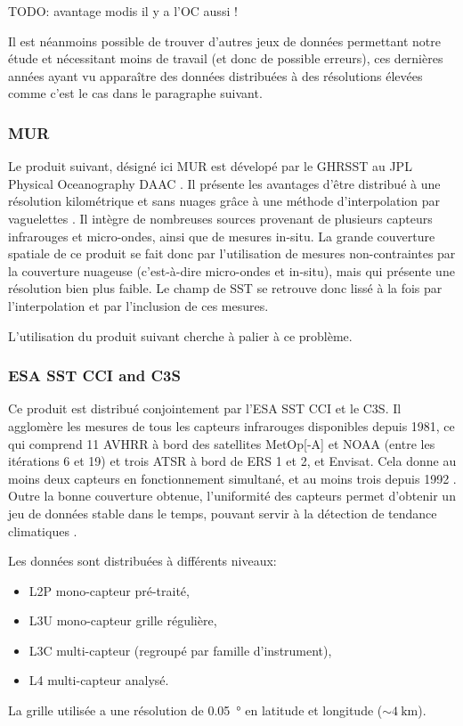 \documentclass[index]{subfiles}
\begin{document}
TODO: avantage modis il y a l'OC aussi !

Il est néanmoins possible de trouver d'autres jeux de données permettant notre étude et nécessitant moins de travail (et donc de possible erreurs), ces dernières années ayant vu apparaître des données distribuées à des résolutions élevées comme c'est le cas dans le paragraphe suivant.

\subsubsection{MUR}
\label{sec:donnees-sst-ghrsst}

Le produit suivant, désigné ici \gls{MUR} est dévelopé par le \gls{GHRSST} au JPL Physical Oceanography DAAC \parencite{sst_mur}.
Il présente les avantages d'être distribué à une résolution kilométrique et sans nuages grâce à une méthode d'interpolation par vaguelettes \parencite{chin_2017}.
Il intègre de nombreuses sources provenant de plusieurs capteurs infrarouges et micro-ondes, ainsi que de mesures in-situ.
La grande couverture spatiale de ce produit se fait donc par l'utilisation de mesures non-contraintes par la couverture nuageuse (c'est-à-dire micro-ondes et in-situ), mais qui présente une résolution bien plus faible.
Le champ de \gls{SST} se retrouve donc lissé à la fois par l'interpolation et par l'inclusion de ces mesures.

L'utilisation du produit suivant cherche à palier à ce problème.

\subsubsection{ESA SST CCI and C3S}
\label{sec:donnees-sst-esacci}

Ce produit est distribué conjointement par l'\gls{ESA} \gls{SST} \gls{CCI} et le \gls{C3S}.
Il agglomère les mesures de tous les capteurs infrarouges disponibles depuis 1981, ce qui comprend 11 \gls{AVHRR} à bord des satellites \gls{MetOp}[-A] et \gls{NOAA} (entre les itérations 6 et 19) et trois \gls{ATSR} à bord de \gls{ERS} 1 et 2, et Envisat.
Cela donne au moins deux capteurs en fonctionnement simultané, et au moins trois depuis 1992 .
Outre la bonne couverture obtenue, l'uniformité des capteurs permet d'obtenir un jeu de données stable dans le temps, pouvant servir à la détection de tendance climatiques \parencite{marchant_2019}.

Les données sont distribuées à différents niveaux:
\begin{itemize}
  \item L2P mono-capteur pré-traité,
  \item L3U mono-capteur grille régulière,
  \item L3C multi-capteur (regroupé par famille d'instrument),
  \item L4 multi-capteur analysé.
\end{itemize}
La grille utilisée a une résolution de \qty{0.05}{\degree} en latitude et longitude (\(\sim\qty{4}{\km}\)).
\end{document}
